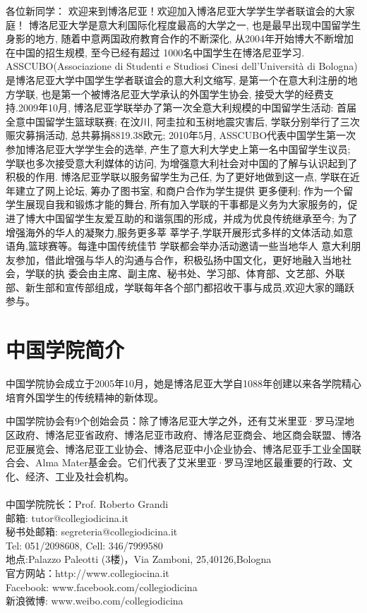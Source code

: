 \documentclass[3pt,a5paper,openright,twoside]{book}
\begin{document}
各位新同学：
             欢迎来到博洛尼亚！欢迎加入博洛尼亚大学学生学者联谊会的大家庭！
          博洛尼亚大学是意大利国际化程度最高的大学之一, 也是最早出现中国留学生身影的地方, 随着中意两国政府教育合作的不断深化, 从2004年开始博大不断增加在中国的招生规模, 至今已经有超过 1000名中国学生在博洛尼亚学习.
          ASSCUBO(Associazione di Studenti e Studiosi Cinesi dell’Università di Bologna)是博洛尼亚大学中国学生学者联谊会的意大利文缩写, 是第一个在意大利注册的地方学联, 也是第一个被博洛尼亚大学承认的外国学生协会, 接受大学的经费支持.2009年10月, 博洛尼亚学联举办了第一次全意大利规模的中国留学生活动: 首届全意中国留学生篮球联赛; 在汶川, 阿圭拉和玉树地震灾害后, 学联分别举行了三次赈灾募捐活动, 总共募捐8819.38欧元;  2010年5月, ASSCUBO代表中国学生第一次参加博洛尼亚大学学生会的选举, 产生了意大利大学史上第一名中国留学生议员; 学联也多次接受意大利媒体的访问, 为增强意大利社会对中国的了解与认识起到了积极的作用.
          博洛尼亚学联以服务留学生为己任, 为了更好地做到这一点, 学联在近年建立了网上论坛, 筹办了图书室, 和商户合作为学生提供 更多便利; 作为一个留学生展现自我和锻炼才能的舞台, 所有加入学联的干事都是义务为大家服务的，促进了博大中国留学生友爱互助的和谐氛围的形成，并成为优良传统继承至今; 为了增强海外的华人的凝聚力,服务更多莘 莘学子,学联开展形式多样的文体活动,如意语角,篮球赛等。每逢中国传统佳节 学联都会举办活动邀请一些当地华人 意大利朋友参加，借此增强与华人的沟通与合作，积极弘扬中国文化，更好地融入当地社会，学联的执 委会由主席、副主席、秘书处、学习部、体育部、文艺部、外联部、新生部和宣传部组成，学联每年各个部门都招收干事与成员,欢迎大家的踊跃参与。 



\section{中国学院简介}


         中国学院协会成立于2005年10月，她是博洛尼亚大学自1088年创建以来各学院精心培育外国学生的传统精神的新体现。

          中国学院协会有9个创始会员：除了博洛尼亚大学之外，还有艾米里亚·罗马涅地区政府、博洛尼亚省政府、博洛尼亚市政府、博洛尼亚商会、地区商会联盟、博洛尼亚展览会、博洛尼亚工业协会、博洛尼亚中小企业协会、博洛尼亚手工业全国联合会、Alma Mater基金会。它们代表了艾米里亚·罗马涅地区最重要的行政、文化、经济、工业及社会机构。\\\\
          \noindent 中国学院院长：Prof. Roberto Grandi\\
		  邮箱: tutor@collegiodicina.it\\
		  秘书处邮箱: segreteria@collegiodicina.it\\
		   Tel: 051/2098608, Cell: 346/7999580 \\
			地点:Palazzo Paleotti (3楼)，Via Zamboni, 25,40126,Bologna\\
官方网站：http://www.collegiocina.it\\
Facebook: www.facebook.com/collegiodicina\\
新浪微博: www.weibo.com/collegiodicina
\end{document}
